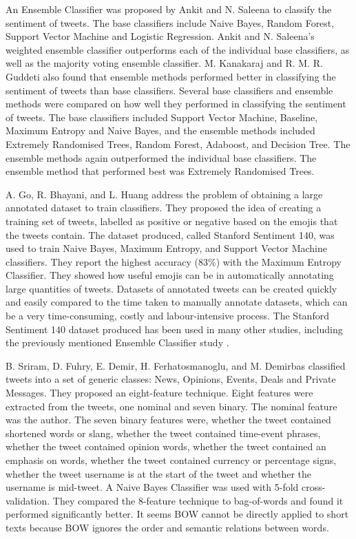 An Ensemble Classifier was proposed by Ankit and N. Saleena \cite{Ankit2018} to classify the sentiment of tweets. The base classifiers include Naive Bayes, Random Forest, Support Vector Machine and Logistic Regression. Ankit and N. Saleena's weighted ensemble classifier outperforms each of the individual base classifiers, as well as the majority voting ensemble classifier. M. Kanakaraj and R. M. R. Guddeti \cite{Kanakaraj2015} also found that ensemble methods performed better in classifying the sentiment of tweets than base classifiers. Several base classifiers and ensemble methods were compared on how well they performed in classifying the sentiment of tweets. The base classifiers included Support Vector Machine, Baseline, Maximum Entropy and Naive Bayes, and the ensemble methods included Extremely Randomised Trees, Random Forest, Adaboost, and Decision Tree. The ensemble methods again outperformed the individual base classifiers. The ensemble method that performed best was Extremely Randomised Trees.

A. Go, R. Bhayani, and L. Huang \cite{Go2009} address the problem of obtaining a large annotated dataset to train classifiers. They proposed the idea of creating a training set of tweets, labelled as positive or negative based on the emojis that the tweets contain. The dataset produced, called Stanford Sentiment 140, was used to train Naive Bayes, Maximum Entropy, and Support Vector Machine classifiers. They report the highest accuracy (83\%) with the Maximum Entropy Classifier. They showed how useful emojis can be in automatically annotating large quantities of tweets. Datasets of annotated tweets can be created quickly and easily compared to the time taken to manually annotate datasets, which can be a very time-consuming, costly and labour-intensive process. The Stanford Sentiment 140 dataset produced has been used in many other studies, including the previously mentioned Ensemble Classifier study \cite{Ankit2018}.

B. Sriram, D. Fuhry, E. Demir, H. Ferhatosmanoglu, and M. Demirbas \cite{sriram2010} classified tweets into a set of generic classes: News, Opinions, Events, Deals and Private Messages. They proposed an eight-feature technique. Eight features were extracted from the tweets, one nominal and seven binary. The nominal feature was the author. The seven binary features were, whether the tweet contained shortened words or slang, whether the tweet contained time-event phrases, whether the tweet contained opinion words, whether the tweet contained an emphasis on words, whether the tweet contained currency or percentage signs, whether the tweet username is at the start of the tweet and whether the username is mid-tweet. A Naive Bayes Classifier was used with 5-fold cross-validation. They compared the 8-feature technique to bag-of-words and found it performed significantly better. It seems BOW cannot be directly applied to short texts because BOW ignores the order and semantic relations between words.

